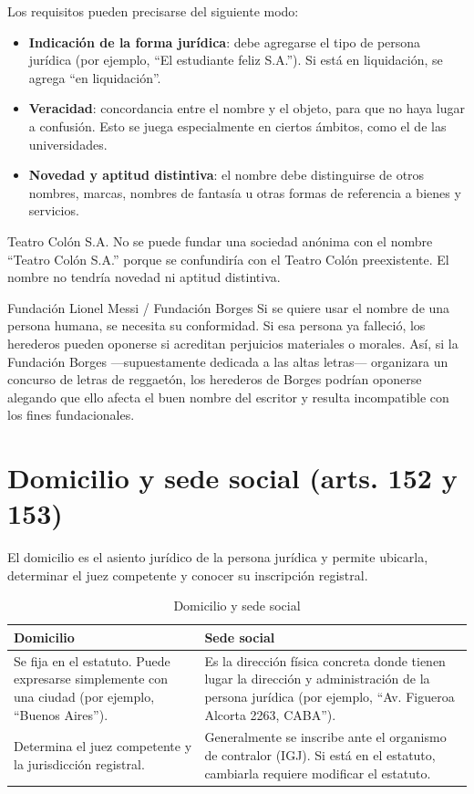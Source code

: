\documentclass[12pt,oneside]{book}
\begin{document}
Los requisitos pueden precisarse del siguiente modo:

\begin{itemize}
    \item \textbf{Indicación de la forma jurídica}: debe agregarse el tipo de persona jurídica (por ejemplo, ``El estudiante feliz S.A.''). Si está en liquidación, se agrega ``en liquidación''.
    \item \textbf{Veracidad}: concordancia entre el nombre y el objeto, para que no haya lugar a confusión. Esto se juega especialmente en ciertos ámbitos, como el de las universidades.
    \item \textbf{Novedad y aptitud distintiva}: el nombre debe distinguirse de otros nombres, marcas, nombres de fantasía u otras formas de referencia a bienes y servicios.
\end{itemize}

\begin{example}{Teatro Colón S.A.}
No se puede fundar una sociedad anónima con el nombre ``Teatro Colón S.A.'' porque se confundiría con el Teatro Colón preexistente. El nombre no tendría novedad ni aptitud distintiva.
\end{example}

\begin{example}{Fundación Lionel Messi / Fundación Borges}
Si se quiere usar el nombre de una persona humana, se necesita su conformidad. Si esa persona ya falleció, los herederos pueden oponerse si acreditan perjuicios materiales o morales. Así, si la Fundación Borges —supuestamente dedicada a las altas letras— organizara un concurso de letras de reggaetón, los herederos de Borges podrían oponerse alegando que ello afecta el buen nombre del escritor y resulta incompatible con los fines fundacionales.
\end{example}

\section{Domicilio y sede social (arts. 152 y 153)}

El domicilio es el asiento jurídico de la persona jurídica y permite ubicarla, determinar el juez competente y conocer su inscripción registral.

\begin{table}[H]
\centering
\caption{Domicilio y sede social}
\begin{tabularx}{\textwidth}{>{\raggedright\arraybackslash}X >{\raggedright\arraybackslash}X}
\toprule
\textbf{Domicilio} & \textbf{Sede social} \\
\midrule
Se fija en el estatuto. Puede expresarse simplemente con una ciudad (por ejemplo, ``Buenos Aires''). & Es la dirección física concreta donde tienen lugar la dirección y administración de la persona jurídica (por ejemplo, ``Av. Figueroa Alcorta 2263, CABA''). \\
Determina el juez competente y la jurisdicción registral. & Generalmente se inscribe ante el organismo de contralor (IGJ). Si está en el estatuto, cambiarla requiere modificar el estatuto. \\
\bottomrule
\end{tabularx}
\end{table}
\end{document}
